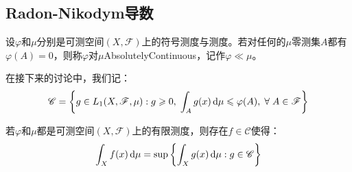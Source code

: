 \subsection{Radon-Nikodym导数}
\begin{definition}
	设$\varphi$和$\mu$分别是可测空间$(X,\mathscr{F})$上的符号测度与测度。若对任何的$\mu$零测集$A$都有$\varphi(A)=0$，则称$\varphi$对$\mu$\gls{AbsolutelyContinuous}，记作$\varphi\ll\mu$。
\end{definition}
在接下来的讨论中，我们记：
\begin{equation*}
	\mathscr{C}=\left\{g\in L_1(X,\mathscr{F},\mu):g\geqslant0,\;\int_{A}g(x)\mathop{}\!\mathrm{d}\mu\leqslant\varphi(A),\;\forall\;A\in\mathscr{F}\right\}
\end{equation*}
\begin{lemma}\label{lem:RadonNikodym1}
	若$\varphi$和$\mu$都是可测空间$(X,\mathscr{F})$上的有限测度，则存在$f\in\mathscr{C}$使得：
	\begin{equation*}
		\int_{X}f(x)\mathop{}\!\mathrm{d}\mu=\sup\left\{\int_{X}g(x)\mathop{}\!\mathrm{d}\mu:g\in\mathscr{C}\right\}
	\end{equation*}
\end{lemma}
